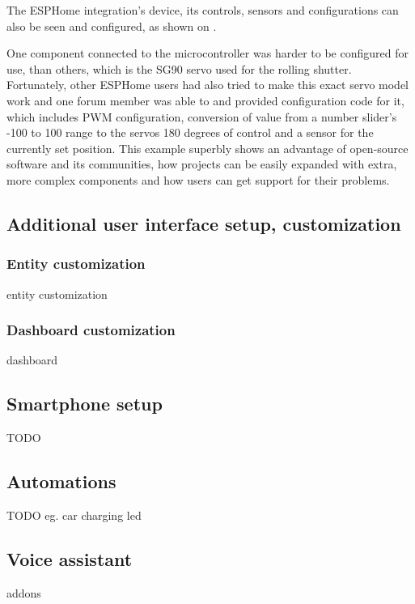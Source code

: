 The ESPHome integration's device, its controls, sensors and configurations can also be seen and configured, as shown on .

One component connected to the microcontroller was harder to be configured for use, than others, which is the SG90 servo used for the rolling shutter. Fortunately, other ESPHome users had also tried to make this exact servo model work and one forum member was able to and provided configuration code for it, which includes PWM configuration, conversion of value from a number slider's -100 to 100 range to the servos 180 degrees of control and a sensor for the currently set position. \cite{ESPHomeForumSG90} This example superbly shows an advantage of open-source software and its communities, how projects can be easily expanded with extra, more complex components and how users can get support for their problems.

\subsection{Additional user interface setup, customization}

\subsubsection{Entity customization}

entity customization

\subsubsection{Dashboard customization}

dashboard

\subsection{Smartphone setup}

TODO

\subsection{Automations}

TODO eg. car charging led

\subsection{Voice assistant}

addons
